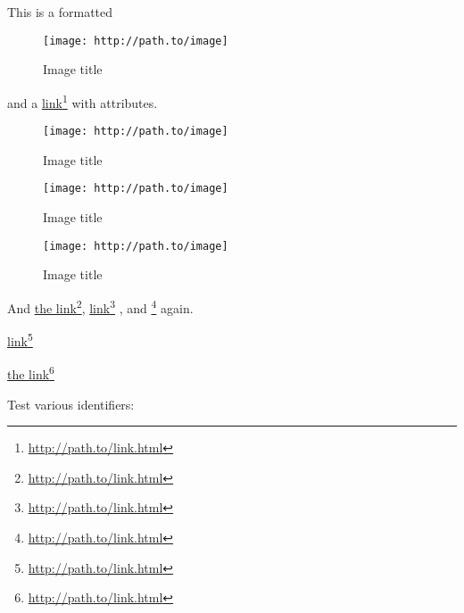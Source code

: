 
\def\mytitle{Link Attributes Test  }

This is a formatted \begin{figure}
\begin{center}
\texttt{[image: http://path.to/image]}
\end{center}
\caption{Image title}
\label{image}
\end{figure}
 and a \href{http://path.to/link.html}{link}\footnote{\href{http://path.to/link.html}{http:\slash \slash path.to\slash link.html}} with attributes.

\begin{figure}
\begin{center}
\texttt{[image: http://path.to/image]}
\end{center}
\caption{Image title}
\label{image2}
\end{figure}


\begin{figure}
\begin{center}
\texttt{[image: http://path.to/image]}
\end{center}
\caption{Image title}
\label{image3}
\end{figure}


\begin{figure}
\begin{center}
\texttt{[image: http://path.to/image]}
\end{center}
\caption{Image title}
\label{image4}
\end{figure}


And \href{http://path.to/link.html}{the link}\footnote{\href{http://path.to/link.html}{http:\slash \slash path.to\slash link.html}}, \href{http://path.to/link.html}{link}\footnote{\href{http://path.to/link.html}{http:\slash \slash path.to\slash link.html}} , and \href{http://path.to/link.html}{}\footnote{\href{http://path.to/link.html}{http:\slash \slash path.to\slash link.html}} again.

\href{http://path.to/link.html}{link}\footnote{\href{http://path.to/link.html}{http:\slash \slash path.to\slash link.html}}

\href{http://path.to/link.html}{the link}\footnote{\href{http://path.to/link.html}{http:\slash \slash path.to\slash link.html}}

Test various identifiers:

